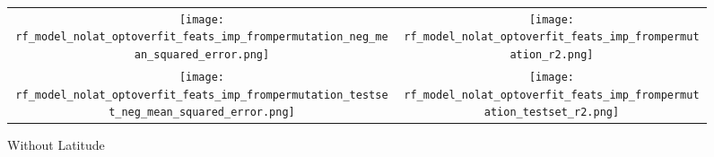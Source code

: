 \documentclass[varwidth, border=10pt]{standalone}
\begin{document}
\begin{figure*}
   \centering
\begin{tabular}{cc}
\texttt{[image: rf\_model\_nolat\_optoverfit\_feats\_imp\_frompermutation\_neg\_mean\_squared\_error.png]}&
\texttt{[image: rf\_model\_nolat\_optoverfit\_feats\_imp\_frompermutation\_r2.png]}\\
\texttt{[image: rf\_model\_nolat\_optoverfit\_feats\_imp\_frompermutation\_testset\_neg\_mean\_squared\_error.png]}&
\texttt{[image: rf\_model\_nolat\_optoverfit\_feats\_imp\_frompermutation\_testset\_r2.png]}\\
\end{tabular}
  \caption*{Without Latitude}
\end{figure*}
\end{document}
